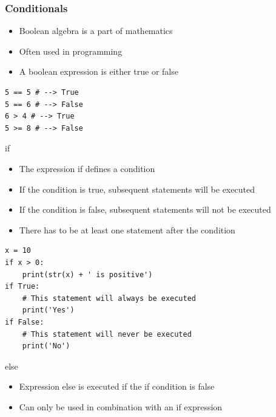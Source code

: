 \documentclass[10pt, a4paper]{beamer} %
\begin{document}
\begin{frame}\frametitle{Conditionals}
\begin{itemize}
\item Boolean algebra is a part of mathematics
\item Often used in programming
\item A boolean expression is either true or false
\end{itemize}

\begin{lstlisting}
5 == 5 # --> True
5 == 6 # --> False
6 > 4 # --> True
5 >= 8 # --> False
\end{lstlisting}

\framebreak
{
    \footnotesize

\begin{examples}

    \begin{block}{\color{mLightBrown}if}

        \begin{itemize}
            \item The expression if defines a condition
            \item If the condition is true, subsequent statements will be executed
            \item If the condition is false, subsequent statements will not be executed
            \item There has to be at least one statement after the condition
        \end{itemize}

    \end{block}
\end{examples}

\begin{lstlisting}
x = 10
if x > 0:
    print(str(x) + ' is positive')
if True:
    # This statement will always be executed
    print('Yes')
if False:
    # This statement will never be executed
    print('No')
\end{lstlisting}
}
\framebreak

    \begin{block}{\color{mLightBrown}else}
        \begin{itemize}
        \item Expression else is executed if the if condition is false
        \item Can only be used in combination with an if expression            
        \end{itemize}
    \end{block}


\end{frame}
\end{document}
